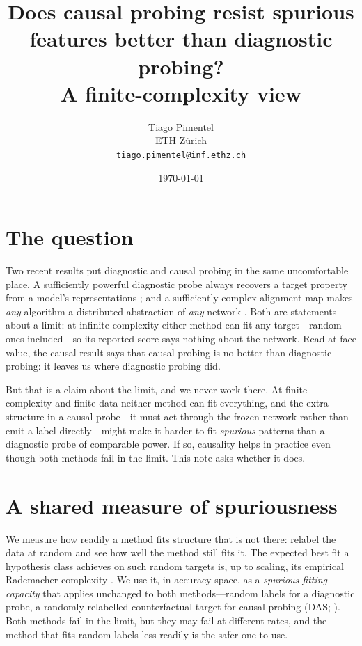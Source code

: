 \documentclass[11pt]{article}
\title{\textbf{Does causal probing resist spurious features better than diagnostic
probing?}\\[2pt] \large A finite-complexity view}
\author{Tiago Pimentel \\ \small ETH Z\"urich \\ \small \texttt{tiago.pimentel@inf.ethz.ch}}
\date{\today}
\begin{document}
\maketitle

\section*{The question}

Two recent results put diagnostic and causal probing in the same uncomfortable place.
A sufficiently powerful diagnostic probe always recovers a target property from a
model's representations \citep{pimentel2020information}; and a sufficiently complex
alignment map makes \emph{any} algorithm a distributed abstraction of \emph{any}
network \citep{sutter2025nonlinear}. Both are statements about a limit: at infinite
complexity either method can fit any target---random ones included---so its reported
score says nothing about the network. Read at face value, the causal result says that
causal probing is no better than diagnostic probing: it leaves us where diagnostic
probing did.

But that is a claim about the limit, and we never work there. At finite complexity and
finite data neither method can fit everything, and the extra structure in a causal
probe---it must act through the frozen network rather than emit a label directly---might
make it harder to fit \emph{spurious} patterns than a diagnostic probe of comparable
power. If so, causality helps in practice even though both methods fail in the limit.
This note asks whether it does.

\section*{A shared measure of spuriousness}

We measure how readily a method fits structure that is not there: relabel the data at
random and see how well the method still fits it. The expected best fit a hypothesis
class achieves on such random targets is, up to scaling, its empirical Rademacher
complexity \citep{bartlett2002rademacher}. We use it, in accuracy space, as a
\emph{spurious-fitting capacity} that applies unchanged to both methods---random labels
for a diagnostic probe, a randomly relabelled counterfactual target for causal probing
(DAS; \citealp{geiger2024finding}). Both methods fail in the limit, but they may fail at
different rates, and the method that fits random labels less readily is the safer one to
use.
\end{document}
